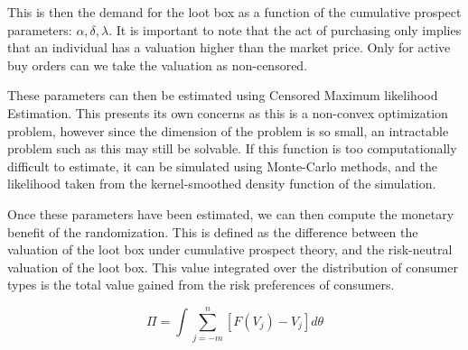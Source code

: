 \documentclass[12pt]{paper}
\begin{document}


This is then the demand for the loot box as a function of the
cumulative prospect parameters: $\alpha, \delta, \lambda$. It is important to note
that the act of purchasing only implies that an individual has a
valuation higher than the market price. Only for active buy orders can
we take the valuation as non-censored.

These parameters can then be estimated using Censored Maximum
likelihood Estimation. This presents its own concerns as this is a
non-convex optimization problem, however since the dimension of the
problem is so small, an intractable problem such as this may still be
solvable. If this function is too computationally difficult to estimate, it can
be simulated using Monte-Carlo methods, and the likelihood taken from
the kernel-smoothed density function of the simulation.

Once these parameters have been estimated, we can then compute the
monetary benefit of the randomization. This is defined as the
difference between the valuation of the loot box under cumulative
prospect theory, and the risk-neutral valuation of the loot box. This
value integrated over the distribution of consumer types is the total
value gained from the risk preferences of consumers.



\begin{equation}
  \label{eq:ValveProfit}
  \Pi = \int \sum_{j=-m}^n \left[ F(V_j) - V_j \right] d\theta
\end{equation}


{}
\end{document}
